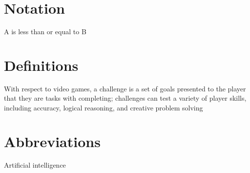 \section*{Notation}
\begin{description}[font=\rmfamily\bfseries, leftmargin=3cm, style=nextline]
	\item[$A \leq B$] A is less than or equal to B
\end{description}

\section*{Definitions}
\begin{description}[font=\rmfamily\bfseries, leftmargin=3cm, style=nextline]
	\item[Challenge] With respect to video games, a challenge is a set of goals presented to the player that they are tasks with completing; challenges can test a variety of player skills, including accuracy, logical reasoning, and creative problem solving
\end{description}

\section*{Abbreviations}
\begin{description}[font=\rmfamily\bfseries, leftmargin=3cm, style=nextline]
	\item[AI] Artificial intelligence
\end{description}